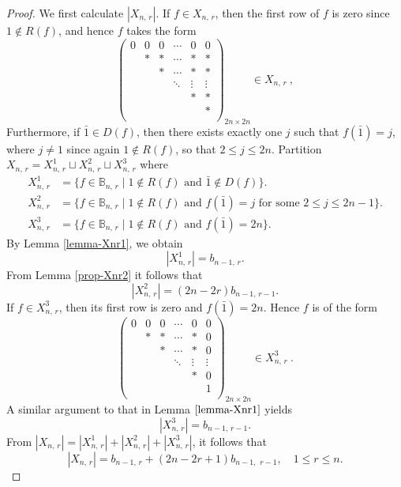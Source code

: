 \documentclass[11pt]{article}
\newcommand{\q}{\quad}
\newcommand{\les}{\leqslant}
\begin{document}
\begin{proof}
We first calculate $|X_{n,\,r}|$. If $f\in X_{n,\,r}$, then the first row of $f$ is zero since $1\notin R(f)$, and hence $f$ takes the form
\[
\begin{pmatrix}
            0 & 0 & 0 &\cdots & 0& 0 \\
              & * & * &\cdots & *& *  \\
              &   & * &\cdots & *& * \\
              &   &   &\ddots &\vdots&\vdots \\
              &   &   &       & *& *  \\
              &   &   &       &  & *  \\
             \end{pmatrix}_{2n \times 2n} \in X_{n,\,r}~,
\]
%
Furthermore, if $\bar 1\in D(f)$, then there exists exactly one $j$ such that $f(\bar{1})=j$, where $j\ne 1$ since again $1\notin R(f)$, so that $2\les j\les 2n$. 
%
Partition $X_{n,\,r}=X_{n,\,r}^1\sqcup X_{n,\,r}^2\sqcup X_{n,\,r}^3$ where
\begin{align*}
X_{n,\,r}^1&=\{f\in \mathbb B_{n,\,r} \mid 1\notin R(f)\text{ and } \bar 1\notin D(f)\}.\\
X_{n,\,r}^2&=\{f\in \mathbb B_{n,\,r} \mid 1\notin R(f)\text{ and } f(\bar{1})=j \text{ for some } 2\les j\les 2n-1\}.\\
X_{n,\,r}^3&=\{f\in \mathbb B_{n,\,r}\mid 1\notin R(f) \text{ and } f(\bar{1})=2n\}.
\end{align*}
%
By Lemma \ref{lemma-Xnr1}, we obtain $$|X_{n,\,r}^1|=b_{n-1,\,r}.$$
%
From Lemma \ref{prop-Xnr2} it follows that  
$$|X_{n,\,r}^2|=(2n-2r)b_{n-1,\,r-1}.$$
If $f\in X_{n,\,r}^3$, then its first row is zero and $f(\bar{1})=2n$. Hence $f$ is of the form
\[
\begin{pmatrix}
            0 & 0 & 0 &\cdots & 0& 0 \\
              & * & * &\cdots & *& 0  \\
              &   & * &\cdots & *& 0 \\
              &   &   &\ddots &\vdots&\vdots \\
              &   &   &       & *& 0  \\
              &   &   &       &  & 1  \\
             \end{pmatrix}_{2n \times 2n}\in X_{n,\,r}^3~.
\]
A similar argument to that in Lemma $\ref{lemma-Xnr1}$ yields
\[
    |X_{n,\,r}^3|=b_{n-1,\,r-1}.
\]
From $|X_{n,\,r}| = |X_{n,\,r}^1|+|X_{n,\,r}^2|+|X_{n,\,r}^3|$, it follows that
\[\label{Xnr}
   |X_{n,\,r}| = b_{n-1, \,r} + (2n-2r+1) b_{n-1,\, ~r-1}, \q 1\les r\les n.\tag{1}
\]


\end{proof}
\end{document}
